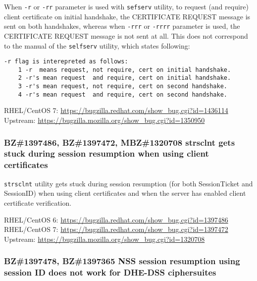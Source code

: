     When \texttt{-r} or \texttt{-rr} parameter is used with \texttt{sefserv}
    utility, to request (and require) client certificate on initial handshake,
    the CERTIFICATE REQUEST message is sent on both handshakes, whereas when
    \texttt{-rrr} or \texttt{-rrrr} parameter is used, the CERTIFICATE REQUEST
    message is not sent at all. This does not correspond to the manual of
    the \texttt{selfserv} utility, which states following:

    \begin{lstlisting}
-r flag is interepreted as follows:
    1 -r  means request, not require, cert on initial handshake.
    2 -r's mean request  and require, cert on initial handshake.
    3 -r's mean request, not require, cert on second handshake.
    4 -r's mean request  and require, cert on second handshake.
    \end{lstlisting}

    \medskip\noindent RHEL/CentOS 7: \url{https://bugzilla.redhat.com/show_bug.cgi?id=1436114}
    \newline\noindent Upstream: \url{https://bugzilla.mozilla.org/show_bug.cgi?id=1350950}

\subsubsection*{BZ\#1397486, BZ\#1397472, MBZ\#1320708  \newline
    strsclnt gets stuck during session resumption when using client certificates}

    \texttt{strsclnt} utility gets stuck during session resumption (for both
    SessionTicket and SessionID) when using client certificates and when the
    server has enabled client certificate verification.

    \medskip\noindent RHEL/CentOS 6: \url{https://bugzilla.redhat.com/show_bug.cgi?id=1397486}
    \newline\noindent RHEL/CentOS 7: \url{https://bugzilla.redhat.com/show_bug.cgi?id=1397472}
    \newline\noindent Upstream: \url{https://bugzilla.mozilla.org/show_bug.cgi?id=1320708}

\subsubsection*{BZ\#1397478, BZ\#1397365  \newline
    NSS session resumption using session ID does not work for DHE-DSS ciphersuites}

